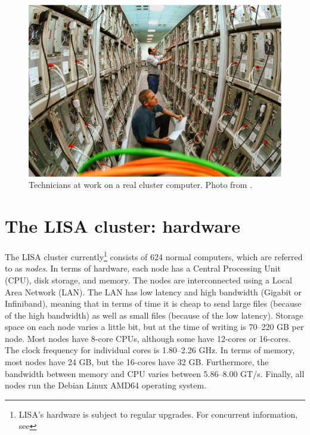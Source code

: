\begin{figure}[htb]
  \centering
    \includegraphics[width=\textwidth]{./../eps/photo-cluster-computer-uchemnitz.eps}
  \caption{Technicians at work on a real cluster computer. Photo from .}
  \label{fig:photo-cluster-computer-uchemnitz}
\end{figure}


\section{The LISA cluster: hardware}

The LISA cluster currently\footnote{LISA's hardware is subject to regular upgrades. For concurrent information, see } consists of 624 normal computers, which are referred to as \textit{nodes}. In terms of hardware, each node has a Central Processing Unit (CPU), disk storage, and memory. The nodes are interconnected using a Local Area Network (LAN). The LAN has low latency and high bandwidth (Gigabit or Infiniband), meaning that in terms of time it is cheap to send large files (because of the high bandwidth) as well as small files (because of the low latency). Storage space on each node varies a little bit, but at the time of writing is 70--220 GB per node. Most nodes have 8-core CPUs, although some have 12-cores or 16-cores. The clock frequency for individual cores is 1.80--2.26 GHz. In terms of memory, most nodes have 24 GB, but the 16-cores have 32 GB. Furthermore, the bandwidth between memory and CPU varies between 5.86--8.00 GT/s. Finally, all nodes run the Debian Linux AMD64 operating system.



